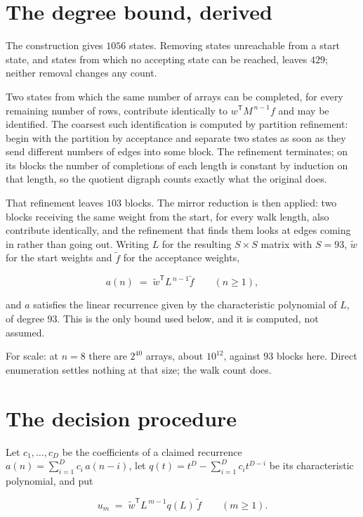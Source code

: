 \documentclass[11pt]{article}
\theoremstyle{definition}
\begin{document}
\section{The degree bound, derived}

The construction gives $1056$ states. Removing states unreachable from a start state, and states from which no accepting state can be reached, leaves $429$; neither removal changes any count.

Two states from which the same number of arrays can be completed, for every remaining number of rows, contribute identically to $w^{\mathsf T}M^{\,n-1}f$ and may be identified. The coarsest such identification is computed by partition refinement: begin with the partition by acceptance and separate two states as soon as they send different numbers of edges into some block. The refinement terminates; on its blocks the number of completions of each length is constant by induction on that length, so the quotient digraph counts exactly what the original does.

That refinement leaves $103$ blocks. The mirror reduction is then applied: two blocks receiving the same weight from the start, for every walk length, also contribute identically, and the refinement that finds them looks at edges coming in rather than going out. Writing $L$ for the resulting $S \times S$ matrix with $S = 93$, $\tilde w$ for the start weights and $\tilde f$ for the acceptance weights,

\[a(n) \;=\; \tilde w^{\mathsf T} L^{\,n-1} \tilde f \qquad (n \ge 1),\]

and $a$ satisfies the linear recurrence given by the characteristic polynomial of $L$, of degree $93$. This is the only bound used below, and it is computed, not assumed.

For scale: at $n = 8$ there are $2^{40}$ arrays, about $10^{12}$, against $93$ blocks here. Direct enumeration settles nothing at that size; the walk count does.

\section{The decision procedure}

Let $c_1,\dots,c_D$ be the coefficients of a claimed recurrence $a(n) = \sum_{i=1}^{D} c_i\,a(n-i)$, let $q(t) = t^{D} - \sum_{i=1}^{D} c_i t^{D-i}$ be its characteristic polynomial, and put

\[u_m \;=\; \tilde w^{\mathsf T} L^{\,m-1} q(L)\,\tilde f \qquad (m \ge 1).\]
\end{document}
